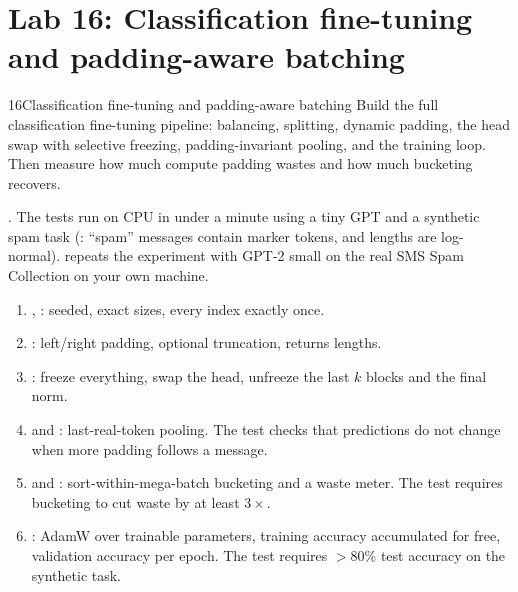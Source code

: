 \section{Lab 16: Classification fine-tuning and padding-aware batching}\label{sec:classify:lab}

\begin{labbox}{16}{Classification fine-tuning and padding-aware batching}
Build the full classification fine-tuning pipeline: balancing, splitting, dynamic
padding, the head swap with selective freezing, padding-invariant pooling, and the
training loop. Then measure how much compute padding wastes and how much bucketing
recovers.

.
The tests run on CPU in under a minute using a tiny GPT and a synthetic spam task
(: ``spam'' messages contain marker tokens, and lengths are
log-normal).  repeats the experiment with GPT-2 small on the real SMS Spam
Collection on your own machine.

\begin{enumerate}
\item {}, : seeded, exact sizes,
every index exactly once.
\item {}: left/right padding, optional truncation, returns lengths.
\item {}: freeze everything, swap the head, unfreeze the
last $k$ blocks and the final norm.
\item {} and : last-real-token
pooling. The test checks that predictions do not change when more padding follows a
message.
\item {} and : sort-within-mega-batch
bucketing and a waste meter. The test requires bucketing to cut waste by at least
$3\times$.
\item {}: AdamW over trainable parameters, training accuracy
accumulated for free, validation accuracy per epoch. The test requires $>80\%$ test
accuracy on the synthetic task.
\end{enumerate}


\end{labbox}
